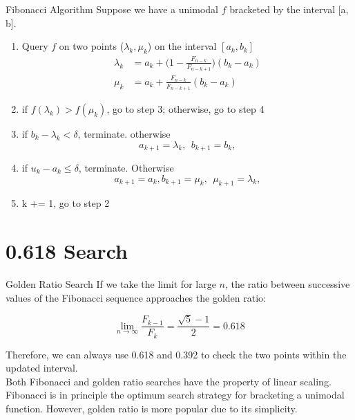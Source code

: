\documentclass{beamer}
\begin{document}
\begin{frame}{Fibonacci Algorithm}
Suppose we have a unimodal $f$ bracketed by the interval [a, b].
\begin{enumerate}
    \item Query $f$ on two points ($\lambda_k, \mu_k$) on the interval $[a_k, b_k]$
    \begin{equation*}
    \begin{split}
        \lambda_k &= a_k + \bigg(1-\frac{F_{n-k}}{F_{n-k+1}}\bigg)(b_k - a_k)\\
        \mu_k &= a_k + \frac{F_{n-k}}{F_{n-k+1}}(b_k - a_k)        
    \end{split}
    \end{equation*}
    \item if $f(\lambda_k) > f(\mu_k)$, go to step 3; otherwise, go to step 4
    \item if $b_k - \lambda_k < \delta$, terminate. otherwise
    \begin{equation*}
        a_{k+1} = \lambda_k, ~~ b_{k+1} = b_k, 
    \end{equation*}
    \item if $u_k - a_k \leq \delta$, terminate. Otherwise
    \begin{equation*}
        a_{k+1} = a_k, b_{k+1} = \mu_k, ~~ \mu_{k+1} = \lambda_k, 
    \end{equation*}
    \item k += 1, go to step 2
\end{enumerate}
\end{frame}

\section{0.618 Search}

\begin{frame}{Golden Ratio Search}
If we take the limit for large $n$, the ratio between successive values of the Fibonacci sequence approaches the golden ratio:

\begin{equation*}
\lim_{n\rightarrow\infty} \frac{F_{k-1}}{F_k} = \frac{\sqrt{5}-1}{2} = 0.618
\end{equation*}

Therefore, we can always use 0.618 and 0.392 to check the two points within the updated interval.\\

Both Fibonacci and golden ratio searches have the property of linear scaling. Fibonacci is in principle the optimum search strategy for bracketing a unimodal function. However, golden ratio is more popular due to its simplicity.

\end{frame}
\end{document}
